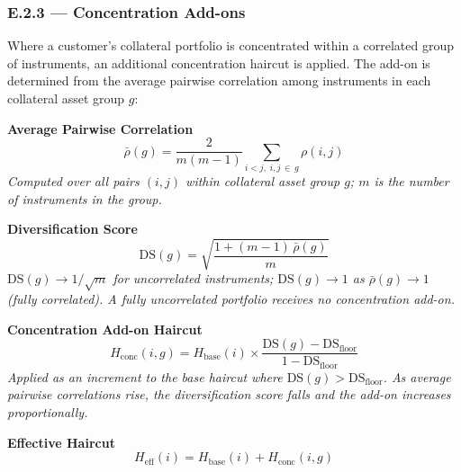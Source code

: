 \documentclass[9pt, a4paper]{extarticle}
\newenvironment{formulabox}{\par\addvspace{4pt}}{\par\addvspace{4pt}}
\begin{document}
\subsubsection{E.2.3 — Concentration Add-ons}

Where a customer's collateral portfolio is concentrated within a correlated group
of instruments, an additional concentration haircut is applied. The add-on is
determined from the average pairwise correlation among instruments in each
collateral asset group $g$:

\begin{formulabox}
\textbf{Average Pairwise Correlation}
\begin{equation*}
    \bar{\rho}(g) =
        \frac{2}{m(m-1)}
        \sum_{i < j,\; i,j \,\in\, g} \rho(i,j)
\end{equation*}
\textit{Computed over all pairs $(i,j)$ within collateral asset group $g$;
$m$ is the number of instruments in the group.}
\end{formulabox}

\begin{formulabox}
\textbf{Diversification Score}
\begin{equation*}
    \mathrm{DS}(g) =
        \sqrt{\frac{1 + (m-1)\,\bar{\rho}(g)}{m}}
\end{equation*}
\textit{$\mathrm{DS}(g) \to 1/\sqrt{m}$ for uncorrelated instruments;
$\mathrm{DS}(g) \to 1$ as $\bar{\rho}(g) \to 1$ (fully correlated).
A fully uncorrelated portfolio receives no concentration add-on.}
\end{formulabox}

\begin{formulabox}
\textbf{Concentration Add-on Haircut}
\begin{equation*}
    H_{\mathrm{conc}}(i,g) =
        H_{\mathrm{base}}(i) \times
        \frac{\mathrm{DS}(g) - \mathrm{DS}_{\mathrm{floor}}}
             {1 - \mathrm{DS}_{\mathrm{floor}}}
\end{equation*}
\textit{Applied as an increment to the base haircut where
$\mathrm{DS}(g) > \mathrm{DS}_{\mathrm{floor}}$.
As average pairwise correlations rise, the diversification score falls and
the add-on increases proportionally.}
\end{formulabox}

\begin{formulabox}
\textbf{Effective Haircut}
\begin{equation*}
    H_{\mathrm{eff}}(i) = H_{\mathrm{base}}(i) + H_{\mathrm{conc}}(i,g)
\end{equation*}
\end{formulabox}
\end{document}
